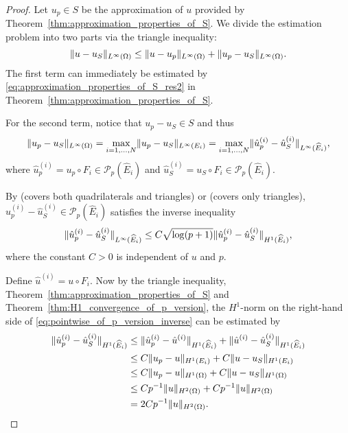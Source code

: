 \documentclass[english, 12pt, a4paper, sci, utf8, a-2b, online]{aaltothesis}
\theoremstyle{definition}
\theoremstyle{plain}
\DeclarePairedDelimiter\norm{\lVert}{\rVert}
\numberwithin{equation}{section}
\begin{document}
\begin{proof}
    Let $u_p \in S$ be the approximation of $u$ provided by
    Theorem~\ref{thm:approximation_properties_of_S}.
    We divide the estimation problem into two parts via the triangle inequality:
    \begin{equation*}
        \norm{u-u_S}_{L^{\infty}(\Omega)}
        \leq \norm{u-u_p}_{L^{\infty}(\Omega)}
            + \norm{u_p-u_S}_{L^{\infty}(\Omega)}.
    \end{equation*}
    The first term can immediately be estimated by
    \eqref{eq:approximation_properties_of_S_res2}
    in Theorem~\ref{thm:approximation_properties_of_S}.
    
    For the second term, notice that $u_p - u_S \in S$ and thus
    \begin{equation}
        \label{eq:pointwise_of_p_version_before_inverse}
        \norm{u_p-u_S}_{L^{\infty}(\Omega)}
        = \max_{i=1,\dotsc,N} \norm{u_p - u_S}_{L^{\infty}(E_i)}
        = \max_{i=1,\dotsc,N}
            \norm{\hat{u}_p^{(i)} - \hat{u}_S^{(i)}}_{L^{\infty}(\widehat{E}_i)},
    \end{equation}
    where $\hat{u}_p^{(i)} = u_p \circ F_i \in \mathcal{P}_p(\widehat{E}_i)$
    and $\hat{u}_S^{(i)} = u_S \circ F_i \in \mathcal{P}_p(\widehat{E}_i)$.

    By \cite[Theorem 4.76 on p.\ 208]{schwab1998}
    (covers both quadrilaterals and triangles)
    or \cite[Proposition 3.1]{boillat1997} (covers only triangles),
    $\hat{u}_p^{(i)} - \hat{u}_S^{(i)} \in \mathcal{P}_p(\widehat{E}_i)$
    satisfies the inverse inequality
    \begin{equation}
        \label{eq:pointwise_of_p_version_inverse}
        \norm{\hat{u}_p^{(i)} - \hat{u}_S^{(i)}}_{L^{\infty}(\widehat{E}_i)}
        \leq C \sqrt{\log(p+1)}
            \norm{\hat{u}_p^{(i)} - \hat{u}_S^{(i)}}_{H^1(\widehat{E}_i)},
    \end{equation}
    where the constant $C > 0$ is independent of $u$ and $p$.
    
    Define $\hat{u}^{(i)} = u \circ F_i$.
    Now by the triangle inequality, Theorem~\ref{thm:approximation_properties_of_S}
    and Theorem~\ref{thm:H1_convergence_of_p_version},
    the $H^1$-norm on the right-hand side of 
    \eqref{eq:pointwise_of_p_version_inverse} can be estimated by
    \begin{align}
        \norm{\hat{u}_p^{(i)} - \hat{u}_S^{(i)}}_{H^1(\widehat{E}_i)}
        &\leq \norm{\hat{u}_p^{(i)} - \hat{u}^{(i)}}_{H^1(\widehat{E}_i)}
            + \norm{\hat{u}^{(i)} - \hat{u}_S^{(i)}}_{H^1(\widehat{E}_i)}
            \nonumber \\
        &\leq C \norm{u_p - u}_{H^1(E_i)} + C \norm{u - u_S}_{H^1(E_i)}
            \nonumber \\
        &\leq C \norm{u_p - u}_{H^1(\Omega)} + C \norm{u - u_S}_{H^1(\Omega)}
            \nonumber \\
        &\leq C p^{-1} \norm{u}_{H^2(\Omega)} + C p^{-1} \norm{u}_{H^2(\Omega)}
            \nonumber \\
        \label{eq:pointwise_of_p_version_inverse_refined}
        &= 2C p^{-1} \norm{u}_{H^2(\Omega)}.
    \end{align}


\end{proof}
\end{document}

